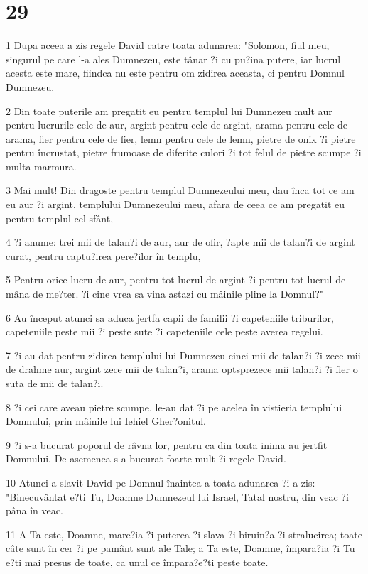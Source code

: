 \chapter{29}

\par 1 Dupa aceea a zis regele David catre toata adunarea: "Solomon, fiul meu, singurul pe care l-a ales Dumnezeu, este tânar ?i cu pu?ina putere, iar lucrul acesta este mare, fiindca nu este pentru om zidirea aceasta, ci pentru Domnul Dumnezeu.
\par 2 Din toate puterile am pregatit eu pentru templul lui Dumnezeu mult aur pentru lucrurile cele de aur, argint pentru cele de argint, arama pentru cele de arama, fier pentru cele de fier, lemn pentru cele de lemn, pietre de onix ?i pietre pentru încrustat, pietre frumoase de diferite culori ?i tot felul de pietre scumpe ?i multa marmura.
\par 3 Mai mult! Din dragoste pentru templul Dumnezeului meu, dau înca tot ce am eu aur ?i argint, templului Dumnezeului meu, afara de ceea ce am pregatit eu pentru templul cel sfânt,
\par 4 ?i anume: trei mii de talan?i de aur, aur de ofir, ?apte mii de talan?i de argint curat, pentru captu?irea pere?ilor în templu,
\par 5 Pentru orice lucru de aur, pentru tot lucrul de argint ?i pentru tot lucrul de mâna de me?ter. ?i cine vrea sa vina astazi cu mâinile pline la Domnul?"
\par 6 Au început atunci sa aduca jertfa capii de familii ?i capeteniile triburilor, capeteniile peste mii ?i peste sute ?i capeteniile cele peste averea regelui.
\par 7 ?i au dat pentru zidirea templului lui Dumnezeu cinci mii de talan?i ?i zece mii de drahme aur, argint zece mii de talan?i, arama optsprezece mii talan?i ?i fier o suta de mii de talan?i.
\par 8 ?i cei care aveau pietre scumpe, le-au dat ?i pe acelea în vistieria templului Domnului, prin mâinile lui Iehiel Gher?onitul.
\par 9 ?i s-a bucurat poporul de râvna lor, pentru ca din toata inima au jertfit Domnului. De asemenea s-a bucurat foarte mult ?i regele David.
\par 10 Atunci a slavit David pe Domnul înaintea a toata adunarea ?i a zis: "Binecuvântat e?ti Tu, Doamne Dumnezeul lui Israel, Tatal nostru, din veac ?i pâna în veac.
\par 11 A Ta este, Doamne, mare?ia ?i puterea ?i slava ?i biruin?a ?i stralucirea; toate câte sunt în cer ?i pe pamânt sunt ale Tale; a Ta este, Doamne, împara?ia ?i Tu e?ti mai presus de toate, ca unul ce împara?e?ti peste toate.
